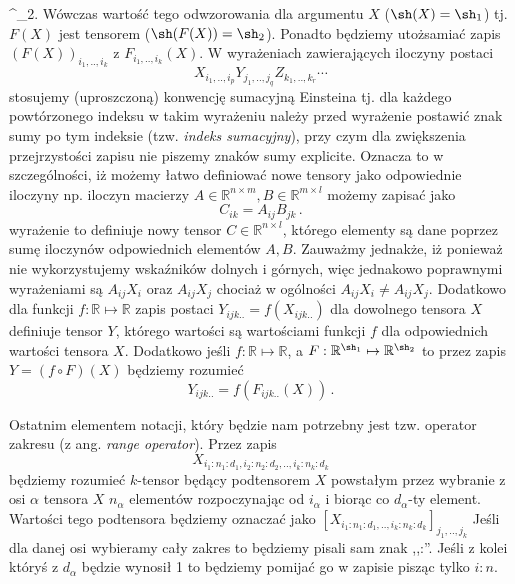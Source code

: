 \documentclass{myclass}
\begin{document}
^{\sh_2}\). Wówczas wartość tego odwzorowania dla argumentu \(X\) (\(\sh(X) = \sh_1\)) tj.
\(F(X)\) jest tensorem (\(\sh(F(X)) = \sh_2\)). Ponadto będziemy utożsamiać zapis
\((F(X))_{i_1,..,i_k}\) z \(F_{i_1,..,i_k}(X)\).\hfill
\break
W wyrażeniach zawierających iloczyny postaci 
\begin{equation*}
    X_{i_1,..,i_p}Y_{j_1,..,j_q}Z_{k_1,..,k_r}\cdots
\end{equation*}
stosujemy (uproszczoną) konwencję sumacyjną Einsteina tj. dla każdego powtórzonego indeksu w takim
wyrażeniu należy przed wyrażenie postawić znak sumy po tym indeksie (tzw. \textit{indeks
sumacyjny}), przy czym dla zwiększenia przejrzystości zapisu nie piszemy znaków sumy explicite.
Oznacza to w szczególności, iż możemy łatwo definiować nowe tensory jako odpowiednie iloczyny np.
iloczyn macierzy \(A \in \mathbb{R}^{n\times m}, B \in \mathbb{R}^{m\times l}\) możemy zapisać jako
\begin{equation*}
    C_{ik} = A_{ij}B_{jk}\,.
\end{equation*}
wyrażenie to definiuje nowy tensor \(C \in \mathbb{R}^{n \times l}\), którego elementy są dane
poprzez sumę iloczynów odpowiednich elementów \(A, B\). Zauważmy jednakże, iż ponieważ nie
wykorzystujemy wskaźników dolnych i górnych, więc jednakowo poprawnymi wyrażeniami są \(A_{ij}X_i\)
oraz \(A_{ij}X_j\) chociaż w ogólności \(A_{ij}X_i \neq A_{ij}X_j\). Dodatkowo dla funkcji \(f:
\mathbb{R} \mapsto \mathbb{R}\) zapis postaci \(Y_{ijk..} = f(X_{ijk..})\) dla dowolnego tensora
\(X\) definiuje tensor \(Y\), którego wartości są wartościami funkcji \(f\) dla odpowiednich
wartości tensora \(X\). Dodatkowo jeśli \(f: \mathbb{R} \mapsto \mathbb{R}\), a \(F :
\mathbb{R}^{\sh_1} \mapsto \mathbb{R}^{\sh_2}\) to przez zapis \(Y = (f \circ F)(X)\) będziemy
rozumieć 
\begin{equation*}
    Y_{ijk..} = f(F_{ijk..}(X))\,.
\end{equation*}

Ostatnim elementem notacji, który będzie nam potrzebny jest tzw. operator zakresu (z ang.
\textit{range operator}). Przez zapis 
\begin{equation*} 
    X_{i_1:n_1:d_1, i_2:n_2:d_2,..,i_k:n_k:d_k}
\end{equation*} 
będziemy rozumieć \(k\)-tensor będący podtensorem \(X\) powstałym przez wybranie z osi \(\alpha\)
tensora \(X\) \(n_\alpha\) elementów rozpoczynając od \(i_\alpha\) i biorąc co \(d_\alpha\)-ty
element. Wartości tego podtensora będziemy oznaczać jako
\([X_{i_1:n_1:d_1,..,i_k:n_k:d_k}]_{j_1,..,j_k}\) Jeśli dla danej osi wybieramy cały zakres to
będziemy pisali sam znak ,,:''. Jeśli z kolei któryś z \(d_\alpha\) będzie wynosił 1 to będziemy
pomijać go w zapisie pisząc tylko \(i:n\).
\end{document}
